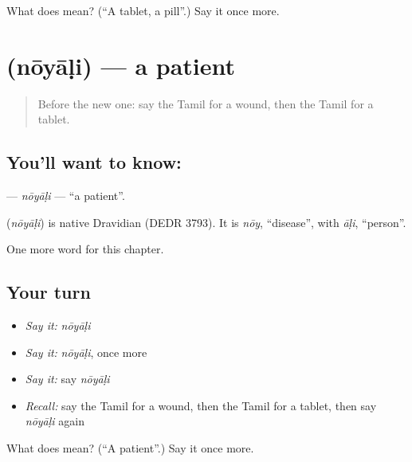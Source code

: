 \begin{tcolorbox}[breakable,colback=teal!4,colframe=teal!35!black,title={Before you move on}]
What does  mean? (\textquotedblleft{}A tablet, a pill\textquotedblright{}.) Say it once more.
\end{tcolorbox}
\section[\texorpdfstring{\ta{நோயாளி} (nōyāḷi)}{நோயாளி (nōyāḷi)}]{ (nōyāḷi) — a patient}

\label{lesson:TA-C232-noyali}



\begin{quote}
Before the new one: say the Tamil for a wound, then the Tamil for a tablet.
\end{quote}

\subsection*{You'll want to know: }
\textbf{} — \emph{nōyāḷi} — \textquotedblleft{}a patient\textquotedblright{}.

\begin{cousinweb}
\textbf{} (\emph{nōyāḷi}) is native Dravidian (DEDR 3793). It is \emph{nōy}, \textquotedblleft{}disease\textquotedblright{}, with \emph{āḷi}, \textquotedblleft{}person\textquotedblright{}.
\end{cousinweb}

\begin{grammarlens}[title={What you've built}]
One more word for this chapter.
\end{grammarlens}

\subsection*{Your turn}
\begin{itemize}
\raggedright
  \item \emph{Say it:} \emph{nōyāḷi}
  \item \emph{Say it:} \emph{nōyāḷi}, once more
  \item \emph{Say it:} say \emph{nōyāḷi}
  \item \emph{Recall:} say the Tamil for a wound, then the Tamil for a tablet, then say \emph{nōyāḷi} again
\end{itemize}

\begin{tcolorbox}[breakable,colback=teal!4,colframe=teal!35!black,title={Before you move on}]
What does  mean? (\textquotedblleft{}A patient\textquotedblright{}.) Say it once more.
\end{tcolorbox}
